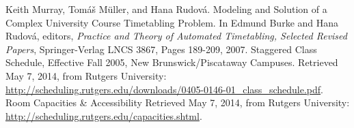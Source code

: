 \documentclass[12pt]{article}
\begin{document}
\begin{thebibliography}{9}
		Keith Murray, Tom{\'a}{\v s} M{\"u}ller, and Hana Rudov{\'a}.
		Modeling and Solution of a Complex University Course Timetabling Problem.
		In Edmund Burke and Hana Rudov{\'a}, editors,
		\emph{Practice and Theory of Automated Timetabling, Selected Revised Papers},
		Springer-Verlag LNCS 3867,
		Pages 189-209,
		2007.
		Staggered Class Schedule, Effective Fall 2005, New Brunswick/Piscataway Campuses.
		Retrieved May 7, 2014, from Rutgers University:
		\url{http://scheduling.rutgers.edu/downloads/0405-0146-01_class_schedule.pdf}.
		Room Capacities \& Accessibility
		Retrieved May 7, 2014, from Rutgers University:
		\url{http://scheduling.rutgers.edu/capacities.shtml}.
\end{thebibliography}
\end{document}
